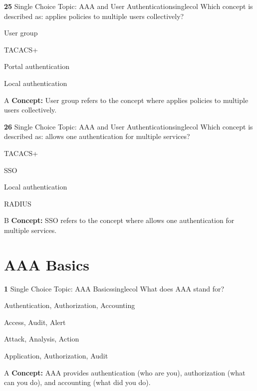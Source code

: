 \documentclass[10pt,a4paper]{article}
\begin{document}
\begin{qcard}{\color{white}\textbf{25} \hfill \small Single Choice \textbar{} Topic: AAA and User Authentication}{singlecol}
Which concept is described as: applies policies to multiple users collectively?

\begin{qoptions}
\item User group
\item TACACS+
\item Portal authentication
\item Local authentication
\end{qoptions}
\begin{explainbox}{A}
\textbf{Concept:} User group refers to the concept where applies policies to multiple users collectively.
\end{explainbox}
\end{qcard}

\begin{qcard}{\color{white}\textbf{26} \hfill \small Single Choice \textbar{} Topic: AAA and User Authentication}{singlecol}
Which concept is described as: allows one authentication for multiple services?

\begin{qoptions}
\item TACACS+
\item SSO
\item Local authentication
\item RADIUS
\end{qoptions}
\begin{explainbox}{B}
\textbf{Concept:} SSO refers to the concept where allows one authentication for multiple services.
\end{explainbox}
\end{qcard}

\section{AAA Basics}
\begin{qcard}{\color{white}\textbf{1} \hfill \small Single Choice \textbar{} Topic: AAA Basics}{singlecol}
What does AAA stand for?

\begin{qoptions}
\item Authentication, Authorization, Accounting
\item Access, Audit, Alert
\item Attack, Analysis, Action
\item Application, Authorization, Audit
\end{qoptions}
\begin{explainbox}{A}
\textbf{Concept:} AAA provides authentication (who are you), authorization (what can you do), and accounting (what did you do).
\end{explainbox}
\end{qcard}
\end{document}
